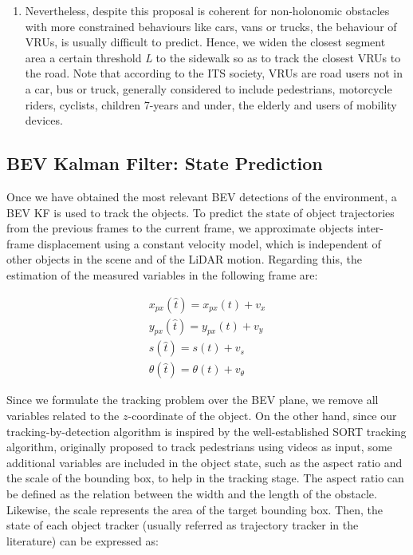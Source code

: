 \begin{enumerate}
	\item Nevertheless, despite this proposal is coherent for non-holonomic obstacles with more constrained behaviours like cars, vans or trucks, the behaviour of \acfp{VRU}, is usually difficult to predict. Hence, we widen the closest segment area a certain threshold \textit{L} to the sidewalk so as to track the closest \acp{VRU} to the road. Note that according to the \ac{ITS} society, \acp{VRU} are road users not in a car, bus or truck, generally considered to include pedestrians, motorcycle riders, cyclists, children 7-years and under, the elderly and users of mobility devices.
	
\end{enumerate}

\subsection{BEV Kalman Filter: State Prediction}
\label{subsec:4_smartmot_state_prediction}

Once we have obtained the most relevant \ac{BEV} detections of the environment, a \ac{BEV} \ac{KF} is used to track the objects. To predict the state of object trajectories from the previous frames to the current frame, we approximate objects inter-frame displacement using a constant velocity model, which is independent of other objects in the scene and of the \ac{LiDAR} motion. Regarding this, the estimation of the measured variables in the following frame are:

\begin{equation}
	\begin{split}
		x_{px}(\hat{t})=x_{px}(t)+v_{x} \\
		y_{px}(\hat{t})=y_{px}(t)+v_{y} \\
		s(\hat{t})=s(t)+v_{s} \\
		\theta(\hat{t})=\theta(t)+v_{\theta}
	\end{split}
\end{equation}

Since we formulate the tracking problem over the \ac{BEV} plane, we remove all variables related to the $\textit{z}$-coordinate of the object. On the other hand, since our tracking-by-detection algorithm is inspired by the well-established \ac{SORT} \cite{bewley2016simple} tracking algorithm, originally proposed to track pedestrians using videos as input, some additional variables are included in the object state, such as the aspect ratio and the scale of the bounding box, to help in the tracking stage. The aspect ratio can be defined as the relation between the width and the length of the obstacle. Likewise, the scale represents the area of the target bounding box. Then, the state of each object tracker (usually referred as trajectory tracker in the literature) can be expressed as:


